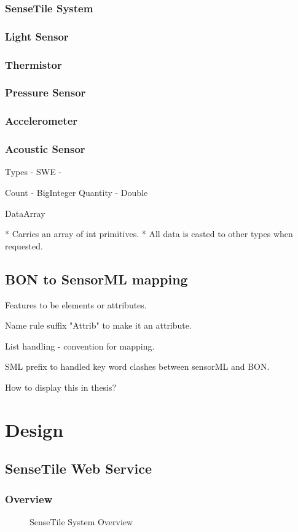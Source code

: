 \documentclass[]{final_report}
\begin{document}
\subsection{SenseTile System}
\subsection{Light Sensor}
\subsection{Thermistor}
\subsection{Pressure Sensor}
\subsection{Accelerometer}
\subsection{Acoustic Sensor}

Types
 - SWE -

Count - BigInteger
Quantity - Double

DataArray

 * Carries an array of int primitives.
 * All data is casted to other types when requested.


\newpage
\section{BON to SensorML mapping}
Features to be elements or attributes.

Name rule suffix "Attrib" to make it an attribute.

List handling - convention for mapping.

SML prefix to handled key word clashes between sensorML and BON.

How to display this in thesis?
\chapter{Design}

\section{SenseTile Web Service}
\subsection{Overview}
 \begin{figure}
\caption{SenseTile System Overview}\label{fig:SystemOverview.png}
\end{figure}
\end{document}
